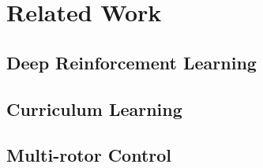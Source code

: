 \chapter{Related Work}%
\label{chp:relwork}

\section{Deep Reinforcement Learning}

\section{Curriculum Learning}

\section{Multi-rotor Control}


